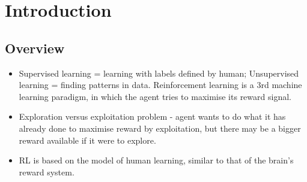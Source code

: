\section{Introduction }	
\subsection{Overview}
\begin{itemize}
	\item Supervised learning = learning with labels defined by human; Unsupervised learning = finding patterns in data. Reinforcement learning is a 3rd machine learning paradigm, in which the agent tries to maximise its reward signal.
	\item Exploration versus exploitation problem - agent wants to do what it has already done to maximise reward by exploitation, but there may be a bigger reward available if it were to explore.
	\item RL is based on the model of human learning, similar to that of the brain's reward system.
\end{itemize}

